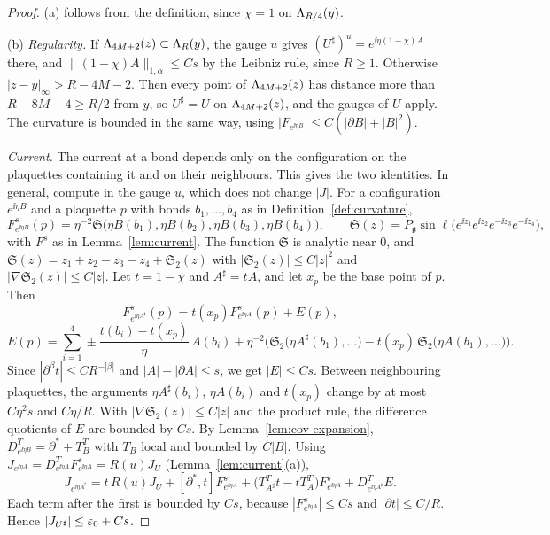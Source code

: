 \begin{proof}
(a) follows from the definition, since $\chi=1$ on $\Lambda_{R/4}(y)$.

(b) \emph{Regularity.} If $\Lambda_{4M+2}(z)\subset\Lambda_R(y)$, the gauge $u$ gives $(U^\sharp)^u=e^{\ii\eta(1-\chi)A}$ there, and $\|(1-\chi)A\|_{1,\alpha}\le Cs$ by the Leibniz rule, since $R\ge1$. Otherwise $|z-y|_\infty>R-4M-2$. Then every point of $\Lambda_{4M+2}(z)$ has distance more than $R-8M-4\ge R/2$ from $y$, so $U^\sharp=U$ on $\Lambda_{4M+2}(z)$, and the gauges of $U$ apply. The curvature is bounded in the same way, using $|F_{e^{\ii\eta B}}|\le C(|\partial B|+|B|^2)$.

\emph{Current.} The current at a bond depends only on the configuration on the plaquettes containing it and on their neighbours. This gives the two identities. In general, compute in the gauge $u$, which does not change $|J|$. For a configuration $e^{\ii\eta B}$ and a plaquette $p$ with bonds $b_1,\dots,b_4$ as in Definition~\ref{def:curvature},
\[
F^s_{e^{\ii\eta B}}(p)=\eta^{-2}\mathfrak S\big(\eta B(b_1),\eta B(b_2),\eta B(b_3),\eta B(b_4)\big),\qquad\mathfrak S(z)=P_{\mathfrak g}\sin\ell\big(e^{\ii z_1}e^{\ii z_2}e^{-\ii z_3}e^{-\ii z_4}\big),
\]
with $F^s$ as in Lemma~\ref{lem:current}. The function $\mathfrak S$ is analytic near $0$, and $\mathfrak S(z)=z_1+z_2-z_3-z_4+\mathfrak S_2(z)$ with $|\mathfrak S_2(z)|\le C|z|^2$ and $|\nabla\mathfrak S_2(z)|\le C|z|$. Let $t=1-\chi$ and $A^\sharp=tA$, and let $x_p$ be the base point of $p$. Then
\[
F^s_{e^{\ii\eta A^\sharp}}(p)=t(x_p)F^s_{e^{\ii\eta A}}(p)+E(p),
\]
\[
E(p)=\sum_{i=1}^4\pm\frac{t(b_i)-t(x_p)}\eta\,A(b_i)+\eta^{-2}\Big(\mathfrak S_2\big(\eta A^\sharp(b_1),\dots\big)-t(x_p)\,\mathfrak S_2\big(\eta A(b_1),\dots\big)\Big).
\]
Since $|\partial^\beta t|\le CR^{-|\beta|}$ and $|A|+|\partial A|\le s$, we get $|E|\le Cs$. Between neighbouring plaquettes, the arguments $\eta A^\sharp(b_i)$, $\eta A(b_i)$ and $t(x_p)$ change by at most $C\eta^2s$ and $C\eta/R$. With $|\nabla\mathfrak S_2(z)|\le C|z|$ and the product rule, the difference quotients of $E$ are bounded by $Cs$. By Lemma~\ref{lem:cov-expansion}, $D^T_{e^{\ii\eta B}}=\partial^*+T_B^T$ with $T_B$ local and bounded by $C|B|$. Using $J_{e^{\ii\eta A}}=D^T_{e^{\ii\eta A}}F^s_{e^{\ii\eta A}}=R(u)J_U$ (Lemma~\ref{lem:current}(a)),
\[
J_{e^{\ii\eta A^\sharp}}=t\,R(u)J_U+[\partial^*,t]F^s_{e^{\ii\eta A}}+\big(T^T_{A^\sharp}t-tT^T_A\big)F^s_{e^{\ii\eta A}}+D^T_{e^{\ii\eta A^\sharp}}E .
\]
Each term after the first is bounded by $Cs$, because $|F^s_{e^{\ii\eta A}}|\le Cs$ and $|\partial t|\le C/R$. Hence $|J_{U^\sharp}|\le\varepsilon_0+Cs$.


\end{proof}
